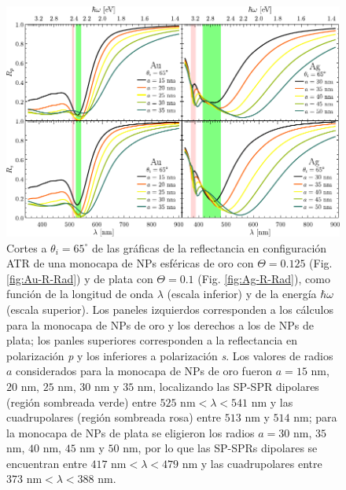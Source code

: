 	\begin{figure}[h!]\centering
	\includegraphics[scale=1]{2-Resultados/figs/8-AurVar/0-cut65_Au_Aug.pdf}\vspace*{-.5em}
	\caption{Cortes a $\theta_i = 65^\circ$ de las gráficas de  la reflectancia  en configuración ATR  de una monocapa de NPs esféricas de oro con $\Theta=0.125$ (Fig. \ref{fig:Au-R-Rad}) y de plata con $\Theta=0.1$ (Fig. \ref{fig:Ag-R-Rad}), como función de la longitud de onda $\lambda$ (escala inferior) y de la energía $\hbar\omega$ (escala superior). Los paneles izquierdos corresponden a los cálculos para la monocapa de NPs de oro y los derechos a los de NPs de plata; los panles superiores corresponden a la reflectancia en polarización \emph{p} y los inferiores a polarización \emph{s}. Los valores de radios $a$ considerados para la monocapa de NPs de oro fueron  $a=15$ nm, $20$ nm, $25$ nm, $30$ nm y $35$ nm, localizando las SP-SPR dipolares (región sombreada verde) entre $525\mbox{ nm}<\lambda<541\mbox{ nm}$ y las cuadrupolares  (región sombreada rosa) entre $513$ nm y $514$ nm; para la monocapa de NPs de plata se eligieron los radios  $a=30$ nm, $35$ nm, $40$ nm, $45$ nm y $50$ nm, por lo que las SP-SPRs dipolares se encuentran entre $417\mbox{ nm}<\lambda<479\mbox{ nm}$ y las cuadrupolares entre $373\mbox{ nm}<\lambda<388\mbox{ nm}$.}\label{fig:AuAg-Cuts-Rad-65}
	\end{figure}

